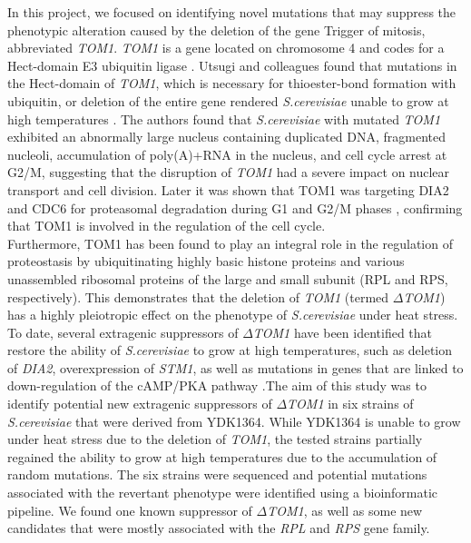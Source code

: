 \documentclass[10pt,a4paper]{article}
\begin{document}
\noindent In this project, we focused on identifying novel mutations that may suppress the phenotypic alteration caused by the deletion of the gene Trigger of mitosis, abbreviated \textit{TOM1}. \textit{TOM1} is a gene located on chromosome 4 and codes for a Hect-domain E3 ubiquitin ligase \cite{utsugi_yeast_1999}. Utsugi and colleagues found that mutations in the Hect-domain of \textit{TOM1}, which is necessary for thioester-bond formation with ubiquitin, or deletion of the entire gene rendered \textit{S.cerevisiae} unable to grow at high temperatures \cite{utsugi_yeast_1999}. The authors found that \textit{S.cerevisiae} with mutated \textit{TOM1} exhibited an abnormally large nucleus containing duplicated DNA, fragmented nucleoli, accumulation of poly(A)+RNA in the nucleus, and cell cycle arrest at G2/M, suggesting that the disruption of \textit{TOM1} had a severe impact on nuclear transport and cell division. Later it was shown that TOM1 was targeting DIA2 and CDC6 for proteasomal degradation during G1 and G2/M phases \cite{kim_hect_2012}, confirming that TOM1 is involved in the regulation of the cell cycle.\\

\noindent Furthermore, TOM1 has been found to play an integral role in the regulation of proteostasis by ubiquitinating highly basic histone proteins \cite{singh_histone_2009} and various unassembled ribosomal proteins of the large and small subunit (RPL and RPS, respectively)\cite{sung_conserved_2016}. This demonstrates that the deletion of \textit{TOM1} (termed \textit{$\Delta$TOM1}) has a highly pleiotropic effect on the phenotype of \textit{S.cerevisiae} under heat stress. To date, several extragenic suppressors of \textit{$\Delta$TOM1} have been identified that restore the ability of  \textit{S.cerevisiae} to grow at high temperatures, such as deletion of \textit{DIA2}\cite{kim_hect_2012}, overexpression of \textit{STM1}\cite{utsugi_high_1995}, as well as mutations in genes that are linked to down-regulation of the cAMP/PKA pathway \cite{sasaki_extragenic_2000}.The aim of this study was to identify potential new extragenic suppressors of \textit{$\Delta$TOM1} in six strains of  \textit{S.cerevisiae} that were derived from YDK1364. While YDK1364 is unable to grow under heat stress due to the deletion of \textit{TOM1}, the tested strains partially regained the ability to grow at high temperatures due to the accumulation of random mutations. The six strains were sequenced and potential mutations associated with the revertant phenotype were identified using a bioinformatic pipeline. We found one known suppressor of \textit{$\Delta$TOM1}, as well as some new candidates that were mostly associated with the \textit{RPL} and \textit{RPS} gene family. \\
\end{document}
